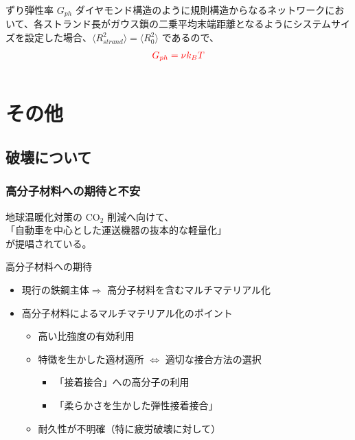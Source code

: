 \documentclass[11pt, dvipdfmx]{beamer}
\begin{document}
\begin{frame}
\begin{columns}[totalwidth=1\textwidth]
\begin{block}{ずり弾性率 $G_{ph}$}
\vspace{3mm}
ダイヤモンド構造のように規則構造からなるネットワークにおいて、各ストランド長がガウス鎖の二乗平均末端距離となるようにシステムサイズを設定した場合、$\langle R_{strand}^2 \rangle = \langle R_0^2 \rangle$ であるので、
\vspace{-3mm}
\begin{align*}
\color{red}
G_{ph}= \nu k_B T
\end{align*}

\end{block}
\end{columns}
\end{frame}

\section{その他}

\subsection{破壊について}

\begin{frame}
\frametitle{高分子材料への期待と不安}
{\Large
地球温暖化対策の CO$_2$ 削減へ向けて、\\
{\color{red}「自動車を中心とした運送機器の抜本的な軽量化」}
\\
が提唱されている。}

\begin{block}{高分子材料への期待}
	\begin{itemize}
	\item
	現行の鉄鋼主体$ \Rightarrow$ 高分子材料を含むマルチマテリアル化
	
	\item
	高分子材料によるマルチマテリアル化のポイント
		\begin{itemize}
		\item
		高い比強度の有効利用
		\item
		特徴を生かした適材適所 $\Leftrightarrow$ 適切な接合方法の選択
			\begin{itemize}
			\large
			\item
			{\color{red} 「接着接合」への高分子の利用}
			\item
			{\color{red} 「柔らかさを生かした弾性接着接合」}
			\end{itemize}
		\Large
		\item
		{\color{blue}耐久性が不明確（特に疲労破壊に対して）}
		\end{itemize}
	\end{itemize}
\end{block}
\normalsize
\end{frame}
\end{document}
